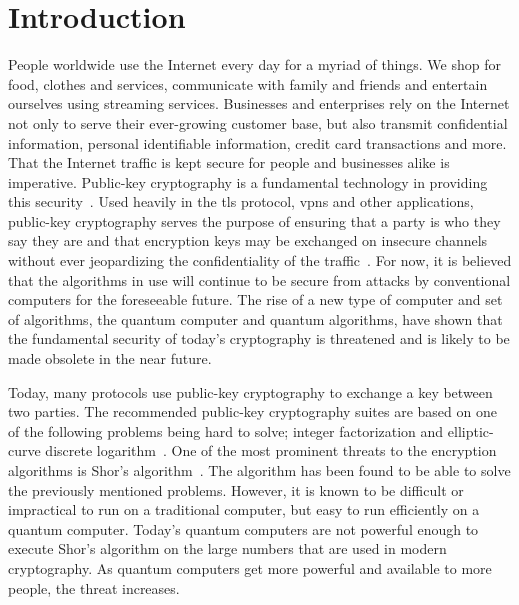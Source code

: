 \chapter{Introduction}
\label{chapter:introduction}


People worldwide use the Internet every day for a myriad of things. We shop for food, clothes and services, communicate with family and friends and entertain ourselves using streaming services. Businesses and enterprises rely on the Internet not only to serve their ever-growing customer base, but also transmit confidential information, personal identifiable information, credit card transactions and more. That the Internet traffic is kept secure for people and businesses alike is imperative. Public-key cryptography is a fundamental technology in providing this security~\cite{rfc8446}. Used heavily in the \gls{tls} protocol, \glspl{vpn} and other applications, public-key cryptography serves the purpose of ensuring that a party is who they say they are and that encryption keys may be exchanged on insecure channels without ever jeopardizing the confidentiality of the traffic~\cite{rfc8446}. For now, it is believed that the algorithms in use will continue to be secure from attacks by conventional computers for the foreseeable future. The rise of a new type of computer and set of algorithms, the quantum computer and quantum algorithms, have shown that the fundamental security of today's cryptography is threatened and is likely to be made obsolete in the near future.

Today, many protocols use public-key cryptography to exchange a key between two parties. The recommended public-key cryptography suites are based on one of the following problems being hard to solve; integer factorization and elliptic-curve discrete logarithm~\cite{nsa2015, nist2019}. One of the most prominent threats to the encryption algorithms is Shor's algorithm~\cite{shor1997}. The algorithm has been found to be able to solve the previously mentioned problems. However, it is known to be difficult or impractical to run on a traditional computer, but easy to run efficiently on a quantum computer. Today's quantum computers are not powerful enough to execute Shor's algorithm on the large numbers that are used in modern cryptography. As quantum computers get more powerful and available to more people, the threat increases.

